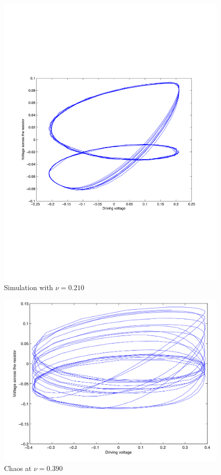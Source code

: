 \documentclass[12pt]{report}
\begin{document}
	\begin{figure}
		\centering
		\includegraphics{simulations/plot0210.pdf}
		\caption{Simulation with $\nu=0.210$}
		\label{fig:sim.0210}
	\end{figure}

	\begin{figure}
		\centering
		\includegraphics{simulations/plotnu0390.png}
		\caption{Chaos at $\nu=0.390$}
		\label{fig:sim.0390}
	\end{figure}
\end{document}
